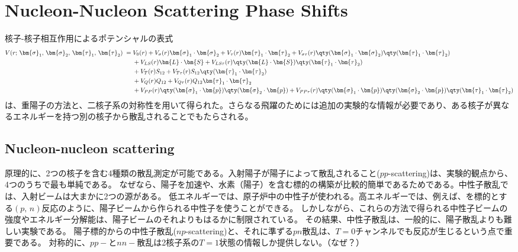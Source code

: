 \documentclass[a4paper,11pt,uplatex]{jsarticle}
\begin{document}
\newpage
\section{Nucleon-Nucleon Scattering Phase Shifts}
核子-核子相互作用によるポテンシャルの表式
\begin{align}
  V(r;\,\bm{\sigma}_1,\,\bm{\sigma}_2,\,\bm{\tau}_1,\,\bm{\tau}_2) \;=\; &
  V_0(r)+V_\sigma(r)\bm{\sigma}_1\cdot\bm{\sigma}_2 + V_\tau(r)\bm{\tau}_1\cdot\bm{\tau}_2
  + V_{\sigma\tau}(r)\qty(\bm{\sigma}_1\cdot\bm{\sigma}_2)\qty(\bm{\tau}_1\cdot\bm{\tau}_2) \notag                                                    \\
                                                                         & +V_{LS}(r)\bm{L}\cdot\bm{S} +
  V_{LS\tau}(r)\qty(\bm{L}\cdot\bm{S})\qty(\bm{\tau}_1\cdot\bm{\tau}_2) \notag                                                                        \\
                                                                         & +V_{T}(r)S_{12}+V_{T\tau}(r)S_{12}\qty(\bm{\tau}_1\cdot\bm{\tau}_2) \notag \\
                                                                         & +V_Q(r)Q_{12}+V_{Q\tau}(r)Q_{12}\bm{\tau}_1\cdot\bm{\tau}_2 \notag         \\
                                                                         & + V_{PP}(r)\qty(\bm{\sigma}_1\cdot\bm{p})\qty(\bm{\sigma}_2\cdot\bm{p})
  +V_{PP\tau}(r)\qty(\bm{\sigma}_1\cdot\bm{p})\qty(\bm{\sigma}_2\cdot\bm{p})\qty(\bm{\tau}_1\cdot\bm{\tau}_2)
\end{align}
は、重陽子の方法と、二核子系の対称性を用いて得られた。さらなる飛躍のためには追加の実験的な情報が必要であり、ある核子が異なるエネルギーを持つ別の核子から散乱されることでもたらされる。

\subsection*{Nucleon-nucleon scattering}
原理的に、2つの核子を含む4種類の散乱測定が可能である。入射陽子が陽子によって散乱されること($pp$-scattering)は、実験的観点から、4つのうちで最も単純である。
なぜなら、陽子を加速や、水素（陽子）を含む標的の構築が比較的簡単であるためである。中性子散乱では、入射ビームは大まかに2つの源がある。
低エネルギーでは、原子炉中の中性子が使われる。高エネルギーでは、例えば、を標的とする$(p,\,n)$反応のように、陽子ビームから作られる中性子を使うことができる。
しかしながら、これらの方法で得られる中性子ビームの強度やエネルギー分解能は、陽子ビームのそれよりもはるかに制限されている。
その結果、中性子散乱は、一般的に、陽子散乱よりも難しい実験である。
陽子標的からの中性子散乱($np$-scattering)と、それに準ずる$pn$散乱は、$T=0$チャンネルでも反応が生じるという点で重要である。
対称的に、$pp-$と$nn-$散乱は2核子系の$T=1$状態の情報しか提供しない。（なぜ？）
\end{document}
